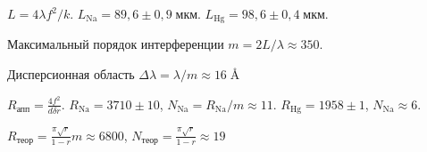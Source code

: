 \begin{figure}[ht!]
\end{figure}
\begin{figure}[ht!]
\end{figure}

$L = 4 \lambda f ^{ 2} / k$. $L_{\text{Na}} = 89{,}6 \pm 0{,}9\;\text{мкм}$. $L_{\text{Hg}} = 98{,}6 \pm 0{,}4 \;\text{мкм}$.

Максимальный порядок интерференции $m = 2L / \lambda \approx 350$.

Дисперсионная область $ \Delta \lambda = \lambda / m \approx 16\; \si{\angstrom}$

$R_{\text{апп}} = \frac{4f^{2}}{d\delta r}$. $R_{\text{Na}} = 3710 \pm 10$, $N_{\text{Na}} = R_{\text{Na}} / m \approx 11$. $R_{\text{Hg}} = 1958 \pm 1$, $N_{\text{Na}} \approx 6 $. 

$R_{\text{теор}} = \frac{ \pi \sqrt{r}}{1 - r} m \approx 6800$, $N_{\text{теор}} = \frac{ \pi \sqrt{r}}{1 - r} \approx 19$
